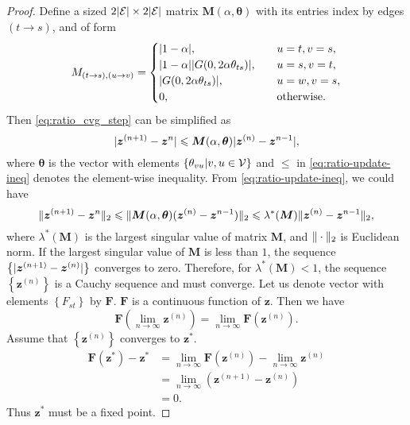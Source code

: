 \documentclass[conference,onecolumn]{IEEEtran}
\begin{document}
\begin{proof}
  Define a sized $2| \mathcal{E} | \times 2| \mathcal{E} |$ matrix $\bm{M}(\alpha, \bm{\theta})$ with its entries index by edges $(t\rightarrow s)$, and of form
  \begin{equation}
    M_{(t\rightarrow s), (u \rightarrow v)} =
    \begin{cases}
      |  1 - \alpha |, &\quad u=t, v=s, \\
      |  1 - \alpha | | G(0, 2 \alpha \theta_{ts}) |, & \quad u = s, v =t, \\
      | G(0, 2 \alpha \theta_{ts}) |, & \quad u = w, v = s, \\
      0, & \quad \mathrm{otherwise}.
    \end{cases}
  \end{equation}
  Then \eqref{eq:ratio_cvg_step} can be simplified as
  \begin{equation}\label{eq:ratio-update-ineq}
    | \bm{z}^{(n+1)} - \bm{z}^{n} | \leqslant \bm{M}(\alpha, \bm{\theta})| \bm{z}^{(n)} - \bm{z}^{n-1} |,
  \end{equation}
  where $\bm{\theta}$ is the vector with elements $\left\{ \theta_{vu}| v, u \in \mathcal{V} \right\}$ and $\leq$ in \eqref{eq:ratio-update-ineq} denotes the element-wise inequality. From \eqref{eq:ratio-update-ineq}, we could have
  \begin{equation}
    \| \bm{z}^{(n+1)} - \bm{z}^{n} \|_{2} \leqslant \| \bm{M}(\alpha, \bm{\theta})(\bm{z}^{(n)} - \bm{z}^{n-1}) \|_{2} \leqslant \lambda^{\ast}(\bm{M})\| \bm{z}^{(n)} - \bm{z}^{n-1} \|_{2},
  \end{equation}
  where $\lambda^{\ast}(\bm{M})$ is the largest singular value of matrix
  $\bm{M}$, and $\| \cdot \|_{2}$ is Euclidean norm. If the largest singular value of $\bm{M}$ is less than $1$, the sequence
  $\left\{| \bm{z}^{(n+1)} - \bm{z}^{(n)} |\right\}$ converges to zero. Therefore, for $\lambda^{\ast}(\bm{M})<1$, the sequence $\left\{ \bm{z}^{(n)} \right\}$ is a Cauchy sequence and must converge. Let us denote vector with elements $\left\{ F_{st} \right\}$ by $\bm{F}$. $\bm{F}$ is a continuous function of $\bm{z}$. Then we have
  \begin{equation}
    \bm{F}(\lim_{n\rightarrow \infty}\bm{z}^{(n)}) = \lim_{n\rightarrow \infty}\bm{F}(\bm{z}^{(n)}).
  \end{equation}
  Assume that $\left\{ \bm{z}^{(n)} \right\}$ converges to
  $\bm{z}^{\ast}$.
  \begin{align}
    \bm{F}(\bm{z}^{\ast}) - \bm{z}^{\ast}
    &= \lim_{n\rightarrow \infty} \bm{F}(\bm{z}^{(n)}) -\lim_{n\rightarrow
      \infty} \bm{z}^{(n)} \nonumber \\
    &= \lim_{n\rightarrow \infty} (\bm{z}^{(n+1)} - \bm{z}^{(n)}) \nonumber \\
    &= 0.
  \end{align}
  Thus $\bm{z}^{\ast}$ must be a fixed point.


\end{proof}
\end{document}
